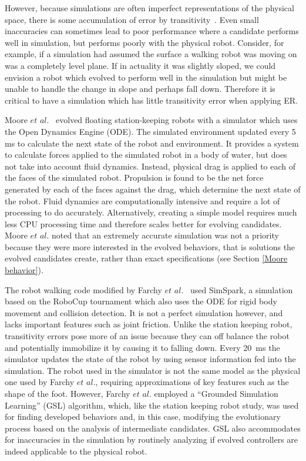 \documentclass{sig-alternate}
\begin{document}
However, because simulations are often imperfect representations of the physical space, there is some accumulation of error by transitivity~\cite{Farchy:2013:HRL:2484920.2484930}. Even small inaccuracies can sometimes lead to poor performance where a candidate performs well in simulation, but performs poorly with the physical robot. Consider, for example, if a simulation had assumed the surface a walking robot was moving on was a completely level plane. If in actuality it was slightly sloped, we could envision a robot which evolved to perform well in the simulation but might be unable to handle the change in slope and perhaps fall down. Therefore it is critical to have a simulation which has little transitivity error when applying ER.

 Moore $et$ $al.$~\cite{Moore:2013:ESK:2463372.2463402} evolved floating station-keeping robots with a simulator which uses the Open Dynamics Engine (ODE). The simulated environment updated every 5 ms to calculate the next state of the robot and environment. It provides a system to calculate forces applied to the simulated robot in a body of water, but does not take into account fluid dynamics. Instead, physical drag is applied to each of the faces of the simulated robot. Propulsion is found to be the net force generated by each of the faces against the drag, which determine the next state of the robot. Fluid dynamics are computationally intensive and require a lot of processing to do accurately. Alternatively, creating a simple model requires much less CPU processing time and therefore scales better for evolving candidates. Moore $et$ $al.$ noted that an extremely accurate simulation was not a priority because they were more interested in the evolved behaviors, that is solutions the evolved candidates create, rather than exact specifications (see Section \ref{Moore behavior}).
 
 The robot walking code modified by Farchy $et$ $al.$~\cite{Farchy:2013:HRL:2484920.2484930} used SimSpark, a simulation based on the RoboCup tournament which also uses the ODE for rigid body movement and collision detection. It is not a perfect simulation however, and lacks important features such as joint friction. Unlike the station keeping robot, transitivity errors pose more of an issue because they can off balance the robot and potentially immobilize it by causing it to falling down. Every 20~ms the simulator updates the state of the robot by using sensor information  fed into the simulation. The robot used in the simulator is not the same model as the physical one used by Farchy $et$ $al.$, requiring approximations of key features such as the shape of the foot. However, Farchy $et$ $al.$ employed a ``Grounded Simulation Learning'' (GSL) algorithm, which, like the station keeping robot study, was used for finding developed behaviors and, in this case, modifying the evolutionary process based on the analysis of intermediate candidates. GSL also accommodates for inaccuracies in the simulation by routinely analyzing if evolved controllers are indeed applicable to the physical robot.
 
\end{document}
